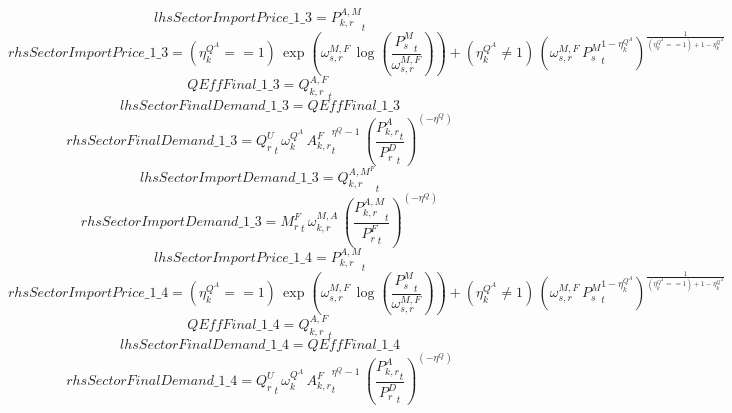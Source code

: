 \begin{dmath*}
lhsSectorImportPrice\_1\_3 = {{P^{A,M}_{k,r}}}_{t}
\end{dmath*}
\begin{dmath*}
rhsSectorImportPrice\_1\_3 = \left({{\eta^{Q^A}_{k}}}==1\right)\, \exp\left({{\omega^{M,F}_{s,r}}}\, \log\left(\frac{{{P^{M}_s}}_{t}}{{{\omega^{M,F}_{s,r}}}}\right)\right)+\left({{\eta^{Q^A}_{k}}}\neq 1\right)\, \left({{\omega^{M,F}_{s,r}}}\, {{P^{M}_s}}_{t}^{1-{{\eta^{Q^A}_{k}}}}\right)^{\frac{1}{\left({{\eta^{Q^A}_{k}}}==1\right)+1-{{\eta^{Q^A}_{k}}}}}
\end{dmath*}
\begin{dmath*}
QEffFinal\_1\_3 = {{Q^{A,F}_{k,r}}}_{t}
\end{dmath*}
\begin{dmath*}
lhsSectorFinalDemand\_1\_3 = {QEffFinal\_1\_3}
\end{dmath*}
\begin{dmath*}
rhsSectorFinalDemand\_1\_3 = {{Q^{U}_{r}}}_{t}\, {{\omega^{Q^A}_{k}}}\, {{A^{F}_{k,r}}}_{t}^{{{\eta^{Q}}}-1}\, \left(\frac{{{P^{A}_{k,r}}}_{t}}{{{P^D_{r}}}_{t}}\right)^{\left(-{{\eta^{Q}}}\right)}
\end{dmath*}
\begin{dmath*}
lhsSectorImportDemand\_1\_3 = {{Q^{A,M^F}_{k,r}}}_{t}
\end{dmath*}
\begin{dmath*}
rhsSectorImportDemand\_1\_3 = {{M^F_r}}_{t}\, {{\omega^{M,A}_{k,r}}}\, \left(\frac{{{P^{A,M}_{k,r}}}_{t}}{{{P^F_{r}}}_{t}}\right)^{\left(-{{\eta^{Q}}}\right)}
\end{dmath*}
\begin{dmath*}
lhsSectorImportPrice\_1\_4 = {{P^{A,M}_{k,r}}}_{t}
\end{dmath*}
\begin{dmath*}
rhsSectorImportPrice\_1\_4 = \left({{\eta^{Q^A}_{k}}}==1\right)\, \exp\left({{\omega^{M,F}_{s,r}}}\, \log\left(\frac{{{P^{M}_s}}_{t}}{{{\omega^{M,F}_{s,r}}}}\right)\right)+\left({{\eta^{Q^A}_{k}}}\neq 1\right)\, \left({{\omega^{M,F}_{s,r}}}\, {{P^{M}_s}}_{t}^{1-{{\eta^{Q^A}_{k}}}}\right)^{\frac{1}{\left({{\eta^{Q^A}_{k}}}==1\right)+1-{{\eta^{Q^A}_{k}}}}}
\end{dmath*}
\begin{dmath*}
QEffFinal\_1\_4 = {{Q^{A,F}_{k,r}}}_{t}
\end{dmath*}
\begin{dmath*}
lhsSectorFinalDemand\_1\_4 = {QEffFinal\_1\_4}
\end{dmath*}
\begin{dmath*}
rhsSectorFinalDemand\_1\_4 = {{Q^{U}_{r}}}_{t}\, {{\omega^{Q^A}_{k}}}\, {{A^{F}_{k,r}}}_{t}^{{{\eta^{Q}}}-1}\, \left(\frac{{{P^{A}_{k,r}}}_{t}}{{{P^D_{r}}}_{t}}\right)^{\left(-{{\eta^{Q}}}\right)}
\end{dmath*}
